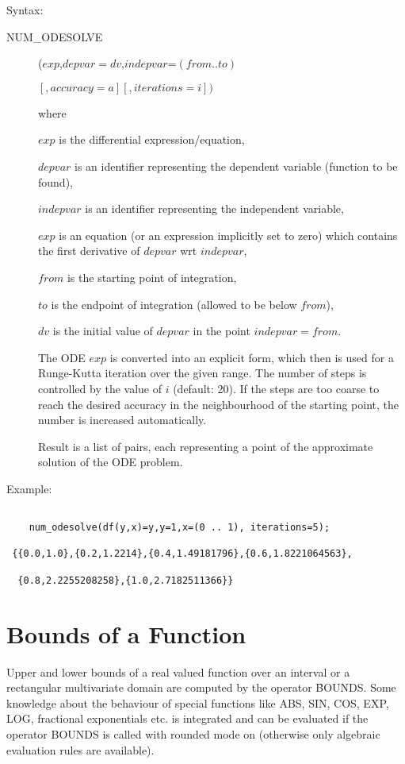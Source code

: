 Syntax:
\begin{description}
\item[NUM\_ODESOLVE]($exp$,$depvar=dv$,$indepvar$=$(from .. to)$

$                   [,accuracy=a][,iterations=i]) $

where

$exp$ is the differential expression/equation,

$depvar$ is an identifier representing the dependent variable
(function to be found),

$indepvar$ is an identifier representing the independent variable,

$exp$ is an equation (or an expression implicitly set to zero) which
contains the first derivative of $depvar$ wrt $indepvar$,

$from$ is the starting point of integration,

$to$ is the endpoint of integration (allowed to be below $from$),

$dv$ is the initial value of $depvar$ in the point $indepvar=from$.

The ODE $exp$ is converted into an explicit form, which then is
used for a Runge-Kutta iteration over the given range. The
number of steps is controlled by the value of $i$
(default: 20).
If the steps are too coarse to reach the desired
accuracy in the neighbourhood of the starting point, the number is
increased automatically.

Result is a list of pairs, each representing a point of the
approximate solution of the ODE problem.
\end{description}


Example:

\begin{verbatim}

    num_odesolve(df(y,x)=y,y=1,x=(0 .. 1), iterations=5);

 {{0.0,1.0},{0.2,1.2214},{0.4,1.49181796},{0.6,1.8221064563},

  {0.8,2.2255208258},{1.0,2.7182511366}}

\end{verbatim}


\section{Bounds of a Function}

Upper and lower bounds of a real valued function over an
interval or a rectangular multivariate domain are computed
by the operator \f{BOUNDS}.  Some knowledge
about the behaviour of special functions like ABS, SIN, COS, EXP, LOG,
fractional exponentials etc. is integrated and can be evaluated
if the operator BOUNDS is called with rounded mode on
(otherwise only algebraic evaluation rules are available).

